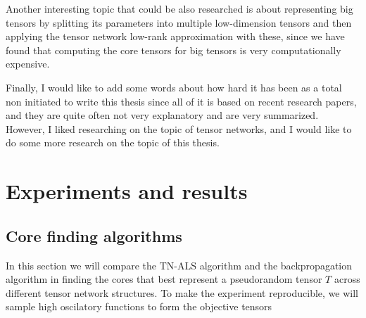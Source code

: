 \documentclass[11pt,a4paper,openright,oneside]{book}
\numberwithin{equation}{section}
\begin{document}
{Another interesting topic that could be also researched is about representing big tensors by splitting its parameters
into multiple low-dimension tensors and then applying the tensor network low-rank approximation with these, since
we have found that computing the core tensors for big tensors is very computationally expensive.

Finally, I would like to add some words about how hard it has been 
as a total non initiated to write this thesis since all of it is based
on recent research papers, and they are quite often not very explanatory and
are very summarized. However, I liked researching on the topic of tensor networks, and I would like
to do some more research on the topic of this thesis.

\normalfont


\newpage

\printbibliography

\appendix
\chapter{Experiments and results}

\section{Core finding algorithms}
In this section we will compare the TN-ALS algorithm and the backpropagation algorithm in finding the cores that
best represent a pseudorandom tensor $T$ across different tensor network structures. To make the experiment reproducible,
we will sample high oscilatory functions to form the objective tensors

}
\end{document}
